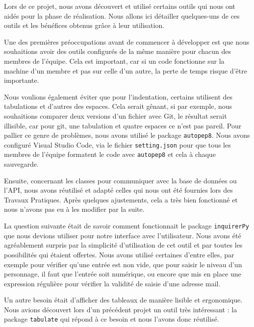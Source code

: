 \documentclass[11pt]{article}
\begin{document}
Lors de ce projet, nous avons découvert et utilisé certains outils qui nous ont aidés pour la phase de réalisation. Nous allons ici détailler quelques-uns de ces outils et les bénéfices obtenus grâce à leur utilisation.

\bigbreak

Une des premières préoccupations avant de commencer à développer est que nous souhaitions avoir des outils configurés de la même manière pour chacun des membres de l'équipe. Cela est important, car si un code fonctionne sur la machine d'un membre et pas sur celle d'un autre, la perte de temps risque d'être importante.


\bigbreak

Nous voulions également éviter que pour l'indentation, certains utilisent des tabulations et d'autres des espaces. Cela serait gênant, si par exemple, nous souhaitions comparer deux versions d'un fichier avec Git, le résultat serait illisible, car pour git, une tabulation et quatre espaces ce n'est pas pareil. Pour pallier ce genre de problèmes, nous avons utilisé le package \texttt{autopep8}. Nous avons configuré Visual Studio Code, via le fichier \texttt{setting.json} pour que tous les membres de l'équipe formatent le code avec \texttt{autopep8} et cela à chaque sauvegarde.

\bigbreak

Ensuite, concernant les classes pour communiquer avec la base de données ou l'API, nous avons réutilisé et adapté celles qui nous ont été fournies lors des Travaux Pratiques. Après quelques ajustements, cela a très bien fonctionné et nous n'avons pas eu à les modifier par la suite.

\bigbreak

La question suivante était de savoir comment fonctionnait le package \texttt{inquirerPy} que nous devions utiliser pour notre interface avec l'utilisateur. Nous avons été agréablement surpris par la simplicité d'utilisation de cet outil et par toutes les possibilités qui étaient offertes. Nous avons utilisé certaines d'entre elles, par exemple pour vérifier qu'une entrée est non vide, que pour saisir le niveau d'un personnage, il faut que l'entrée soit numérique, ou encore que mis en place une expression régulière pour vérifier la validité de saisie d'une adresse mail.

\bigbreak

Un autre besoin était d'afficher des tableaux de manière lisible et ergonomique. Nous avions découvert lors d'un précédent projet un outil très intéressant : la package \texttt{tabulate} qui répond à ce besoin et nous l'avons donc réutilisé.
\end{document}
